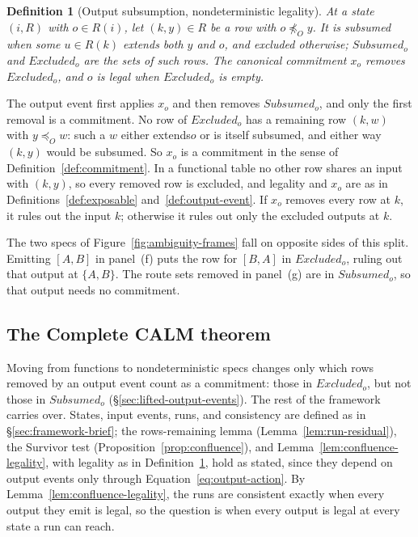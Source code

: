 \documentclass[sigconf]{cidr-2027}
\newtheorem{definition}{Definition}
\theoremstyle{remark}
\newcommand{\OutputOrd}{\preceq_O}
\newcommand{\commitment}{commitment\xspace}
\newcommand{\outrel}{extends\xspace}          %
\newcommand{\Subsumed}{\mathit{Subsumed}}
\newcommand{\Excluded}{\mathit{Excluded}}
\begin{document}
\begin{definition}[Output subsumption, nondeterministic legality]
\label{def:subsumed-excluded}
At a state $(i,R)$ with $o\in R(i)$, let $(k,y)\in R$ be a row with
$o\not\OutputOrd y$.  It is \emph{subsumed} when some $u\in R(k)$ \outrel both $y$ and $o$, and \emph{excluded} otherwise; $\Subsumed_o$
and $\Excluded_o$ are the sets of such rows.  The \emph{canonical \commitment}
$x_o$ removes $\Excluded_o$, and $o$ is \emph{legal} when $\Excluded_o$ is
empty.
\end{definition}

The output event first applies $x_o$ and then removes $\Subsumed_o$, and only
the first removal is a \commitment.  No row of $\Excluded_o$ has a remaining row
$(k,w)$ with $y\OutputOrd w$: such a $w$ either \outrel $o$ or is itself
subsumed, and either way $(k,y)$ would be subsumed.  So $x_o$ is a \commitment
in the sense of Definition~\ref{def:commitment}.  In a functional table no
other row shares an input with $(k,y)$, so every removed row is excluded, and
legality and $x_o$ are as in Definitions~\ref{def:exposable}
and~\ref{def:output-event}.  If $x_o$ removes every row at $k$, it rules out the
input $k$; otherwise it rules out only the excluded outputs at $k$.

The two specs of Figure~\ref{fig:ambiguity-frames} fall on opposite sides of this split.  Emitting $[A,B]$ in panel~(f) puts the row for $[B,A]$ in $\Excluded_o$, ruling out that output at $\{A,B\}$.  The route sets removed in panel~(g) are in $\Subsumed_o$, so that output needs no \commitment.

\subsection{The Complete CALM theorem}
\label{sec:complete-calm-theorem}

Moving from functions to nondeterministic specs changes only which rows
removed by an output event count as a \commitment: those in $\Excluded_o$, but
not those in $\Subsumed_o$ (\S\ref{sec:lifted-output-events}).  The rest of the
framework carries over.  States, input events, runs, and consistency are defined as in \S\ref{sec:framework-brief}; the
rows-remaining lemma (Lemma~\ref{lem:run-residual}), the Survivor test
(Proposition~\ref{prop:confluence}), and Lemma~\ref{lem:confluence-legality},
with legality as in Definition~\ref{def:subsumed-excluded}, hold as stated, since
they depend on output events only through Equation~\ref{eq:output-action}.
By Lemma~\ref{lem:confluence-legality}, the runs are consistent exactly when
every output they emit is legal, so the question is when every output is legal
at every state a run can reach.
\end{document}

